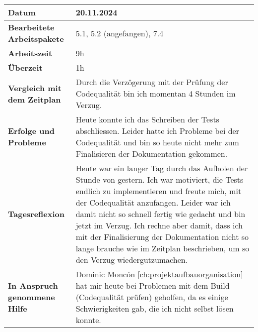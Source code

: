 \begin{longtable}{p{}|p{}}
	\hline
	\textbf{Datum}                       & 20.11.2024            \\
	\hline
	\textbf{Bearbeitete Arbeitspakete}   & 5.1, 5.2 (angefangen), 7.4                  \\
	\hline
	\textbf{Arbeitszeit}                 & 9h                                    \\
	\hline
	\textbf{Überzeit}                    & 1h                                    \\
	\hline
	\textbf{Vergleich mit dem Zeitplan}  & Durch die Verzögerung mit der Prüfung der Codequalität bin ich momentan 4 Stunden im Verzug.\\
	\hline
	\textbf{Erfolge und Probleme} & Heute konnte ich das Schreiben der Tests abschliessen. Leider hatte ich Probleme bei der Codequalität und bin so heute nicht mehr zum Finalisieren der Dokumentation gekommen.
	\\
	\hline
	\textbf{Tagesreflexion} & Heute war ein langer Tag durch das Aufholen der Stunde von gestern. Ich war motiviert, die Tests endlich zu implementieren und freute mich, mit der Codequalität anzufangen. Leider war ich damit nicht so schnell fertig wie gedacht und bin jetzt im Verzug. Ich rechne aber damit, dass ich mit der Finalisierung der Dokumentation nicht so lange brauche wie im Zeitplan beschrieben, um so den Verzug wiedergutzumachen.
	\\
	\hline
	\textbf{In Anspruch genommene Hilfe} & Dominic Moncón \ref{ch:projektaufbauorganisation} hat mir heute bei Problemen mit dem Build (Codequalität prüfen) geholfen, da es einige Schwierigkeiten gab, die ich nicht selbst lösen konnte.                            \\
	\hline
\end{longtable}\label{tab:arbeitsprotokoll-20.11.2024}
\newpage

